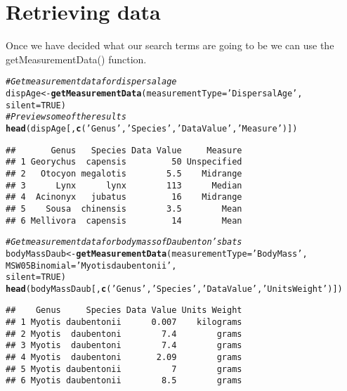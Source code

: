 \documentclass[a4paper]{article}\usepackage[]{graphicx}\usepackage[]{color}
\makeatletter
\newcommand{\hlnum}[1]{\textcolor[rgb]{0.686,0.059,0.569}{#1}}%
\newcommand{\hlstr}[1]{\textcolor[rgb]{0.192,0.494,0.8}{#1}}%
\newcommand{\hlcom}[1]{\textcolor[rgb]{0.678,0.584,0.686}{\textit{#1}}}%
\newcommand{\hlstd}[1]{\textcolor[rgb]{0.345,0.345,0.345}{#1}}%
\newcommand{\hlkwb}[1]{\textcolor[rgb]{0.69,0.353,0.396}{#1}}%
\newcommand{\hlkwc}[1]{\textcolor[rgb]{0.333,0.667,0.333}{#1}}%
\newcommand{\hlkwd}[1]{\textcolor[rgb]{0.737,0.353,0.396}{\textbf{#1}}}%
\newenvironment{kframe}{%
 \def\at@end@of@kframe{}%
 \ifinner\ifhmode%
  \def\at@end@of@kframe{\end{minipage}}%
  \begin{minipage}{\columnwidth}%
 \fi\fi%
 \def\FrameCommand##1{\hskip\@totalleftmargin \hskip-\fboxsep
 \colorbox{shadecolor}{##1}\hskip-\fboxsep
     \hskip-\linewidth \hskip-\@totalleftmargin \hskip\columnwidth}%
 \MakeFramed {\advance\hsize-\width
   \@totalleftmargin\z@ \linewidth\hsize
   \@setminipage}}%
 {\par\unskip\endMakeFramed%
 \at@end@of@kframe}
\newenvironment{knitrout}{}{} %
\makeatother
\begin{document}
\section{Retrieving data}
Once we have decided what our search terms are going to be we can use the getMeasurementData() function.

\begin{knitrout}
\color{fgcolor}\begin{kframe}
\begin{alltt}
\hlcom{# Get measurement data for dispersal age}
\hlstd{dispAge} \hlkwb{<-} \hlkwd{getMeasurementData}\hlstd{(}\hlkwc{measurementType} \hlstd{=} \hlstr{'Dispersal Age'}\hlstd{,}
                              \hlkwc{silent} \hlstd{=} \hlnum{TRUE}\hlstd{)}
\hlcom{# Preview some of the results}
\hlkwd{head}\hlstd{(dispAge[,}\hlkwd{c}\hlstd{(}\hlstr{'Genus'}\hlstd{,}\hlstr{'Species'}\hlstd{,}\hlstr{'Data Value'}\hlstd{,}\hlstr{'Measure'}\hlstd{)])}
\end{alltt}
\begin{verbatim}
##       Genus   Species Data Value     Measure
## 1 Georychus  capensis         50 Unspecified
## 2   Otocyon megalotis        5.5    Midrange
## 3      Lynx      lynx        113      Median
## 4  Acinonyx   jubatus         16    Midrange
## 5    Sousa  chinensis        3.5        Mean
## 6 Mellivora  capensis         14        Mean
\end{verbatim}
\begin{alltt}
\hlcom{# Get measurement data for body mass of Daubenton's bats}
\hlstd{bodyMassDaub} \hlkwb{<-} \hlkwd{getMeasurementData}\hlstd{(}\hlkwc{measurementType} \hlstd{=} \hlstr{'Body Mass'}\hlstd{,}
                                   \hlkwc{MSW05Binomial} \hlstd{=} \hlstr{'Myotis daubentonii'}\hlstd{,}
                                   \hlkwc{silent} \hlstd{=} \hlnum{TRUE}\hlstd{)}
\hlkwd{head}\hlstd{(bodyMassDaub[,}\hlkwd{c}\hlstd{(}\hlstr{'Genus'}\hlstd{,}\hlstr{'Species'}\hlstd{,}\hlstr{'Data Value'}\hlstd{,}\hlstr{'Units Weight'}\hlstd{)])}
\end{alltt}
\begin{verbatim}
##    Genus     Species Data Value Units Weight
## 1 Myotis daubentonii      0.007    kilograms
## 2 Myotis  daubentoni        7.4        grams
## 3 Myotis  daubentoni        7.4        grams
## 4 Myotis  daubentoni       2.09        grams
## 5 Myotis daubentonii          7        grams
## 6 Myotis daubentonii        8.5        grams
\end{verbatim}

\end{kframe}
\end{knitrout}
\end{document}
